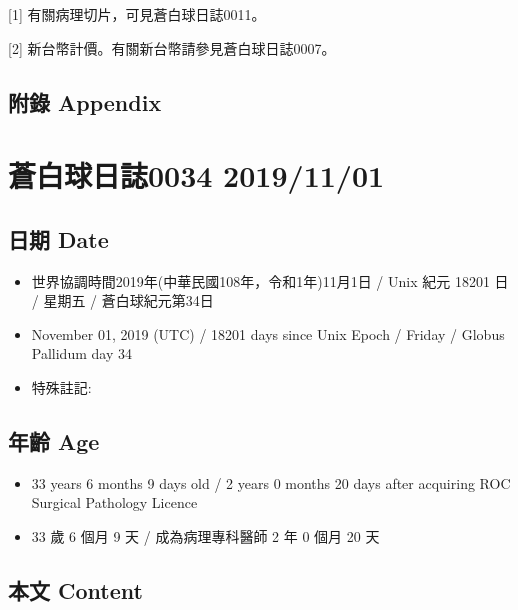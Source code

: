 \documentclass[
]{article}
\providecommand{\tightlist}{%
  \setlength{\itemsep}{0pt}\setlength{\parskip}{0pt}}
\begin{document}
{[}1{]} 有關病理切片，可見蒼白球日誌0011。

{[}2{]} 新台幣計價。有關新台幣請參見蒼白球日誌0007。

\hypertarget{ux9644ux9304-appendix-25}{%
\subsection{附錄 Appendix}\label{ux9644ux9304-appendix-25}}

\hypertarget{ux84bcux767dux7403ux65e5ux8a8c0034-20191101}{%
\section{蒼白球日誌0034
2019/11/01}\label{ux84bcux767dux7403ux65e5ux8a8c0034-20191101}}

\hypertarget{ux65e5ux671f-date-33}{%
\subsection{日期 Date}\label{ux65e5ux671f-date-33}}

\begin{itemize}
\tightlist
\item
  世界協調時間2019年(中華民國108年，令和1年)11月1日 / Unix 紀元 18201 日
  / 星期五 / 蒼白球紀元第34日
\item
  November 01, 2019 (UTC) / 18201 days since Unix Epoch / Friday /
  Globus Pallidum day 34
\item
  特殊註記:
\end{itemize}

\hypertarget{ux5e74ux9f61-age-33}{%
\subsection{年齡 Age}\label{ux5e74ux9f61-age-33}}

\begin{itemize}
\tightlist
\item
  33 years 6 months 9 days old / 2 years 0 months 20 days after
  acquiring ROC Surgical Pathology Licence
\item
  33 歲 6 個月 9 天 / 成為病理專科醫師 2 年 0 個月 20 天
\end{itemize}

\hypertarget{ux672cux6587-content-33}{%
\subsection{本文 Content}\label{ux672cux6587-content-33}}
\end{document}
